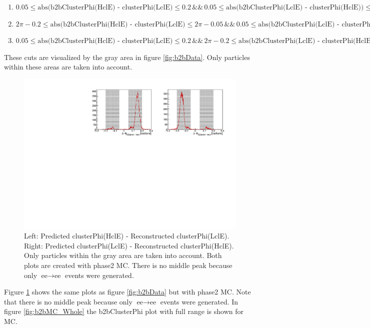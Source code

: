 \documentclass[a4paper,11pt,twosided,final,german,openbib,pdftex,listof=totoc,bibliography=totoc]{scrbook}
\begin{document}
\begin{enumerate}[label=(\alph*)]
	\item $0.05 \leq \textrm{abs(b2bClusterPhi(HclE) - clusterPhi(LclE)} \leq 0.2 \, \&\& \, 0.05 \leq \textrm{abs(b2bClusterPhi(LclE) - clusterPhi(HclE))} \leq 0.2$
	\item $2\pi - 0.2 \leq \textrm{abs(b2bClusterPhi(HclE) - clusterPhi(LclE)} \leq 2\pi - 0.05 \, \&\& \, 0.05 \leq \textrm{abs(b2bClusterPhi(LclE) - clusterPhi(HclE))} \leq 0.2$
	\item $0.05 \leq \textrm{abs(b2bClusterPhi(HclE) - clusterPhi(LclE)} \leq 0.2 \, \&\& \, 2\pi - 0.2 \leq \textrm{abs(b2bClusterPhi(LclE) - clusterPhi(HclE))} \leq 2\pi - 0.05$
\end{enumerate}

These cuts are visualized by the gray area in figure \ref{fig:b2bData}. Only particles within these areas are taken into account.




\begin{figure}[h!]
	\centering
	\includegraphics[width=\textwidth]{Plots/master/sb2b_MC.pdf}
	\caption[b2bClusterPhi - clusterPhi For MC]{Left: Predicted clusterPhi(HclE) - Reconstructed clusterPhi(LclE). Right: Predicted clusterPhi(LclE) - Reconstructed clusterPhi(HclE). Only particles within the gray area are taken into account. Both plots are created with phase2 MC. There is no middle peak because only $\textrm{ee} \rightarrow \textrm{ee}$ events were generated.}
	\label{fig:b2bMC}
\end{figure}



Figure \ref{fig:b2bMC} shows the same plots as figure \ref{fig:b2bData} but with phase2 MC. Note that there is no middle peak because only $\textrm{ee} \rightarrow \textrm{ee}$ events were generated. In figure \ref{fig:b2bMC_Whole} the b2bClusterPhi plot with full range is shown for MC.
\end{document}
